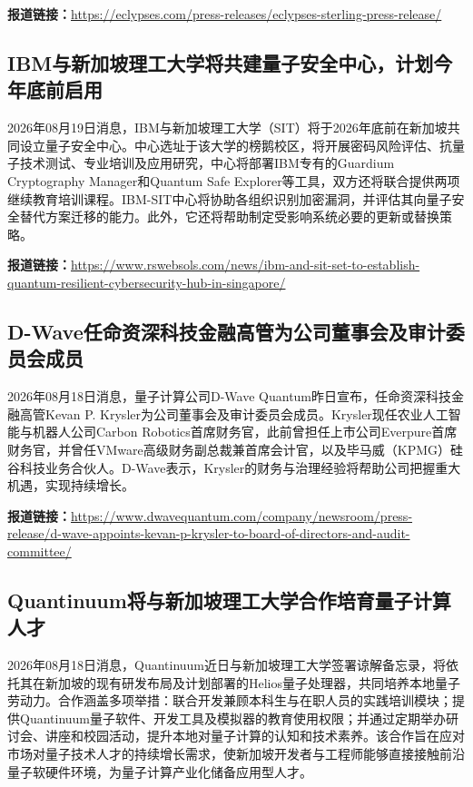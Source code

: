 \documentclass[12pt,a4paper]{ctexart}
\begin{document}
\noindent\textbf{报道链接：}\url{https://eclypses.com/press-releases/eclypses-sterling-press-release/}

\subsection{ IBM与新加坡理工大学将共建量子安全中心，计划今年底前启用 }

2026年08月19日消息，IBM与新加坡理工大学（SIT）将于2026年底前在新加坡共同设立量子安全中心。中心选址于该大学的榜鹅校区，将开展密码风险评估、抗量子技术测试、专业培训及应用研究，中心将部署IBM专有的Guardium Cryptography Manager和Quantum Safe Explorer等工具，双方还将联合提供两项继续教育培训课程。IBM-SIT中心将协助各组织识别加密漏洞，并评估其向量子安全替代方案迁移的能力。此外，它还将帮助制定受影响系统必要的更新或替换策略。

\noindent\textbf{报道链接：}\url{https://www.rswebsols.com/news/ibm-and-sit-set-to-establish-quantum-resilient-cybersecurity-hub-in-singapore/}

\subsection{ D-Wave任命资深科技金融高管为公司董事会及审计委员会成员 }

2026年08月18日消息，量子计算公司D-Wave Quantum昨日宣布，任命资深科技金融高管Kevan P. Krysler为公司董事会及审计委员会成员。Krysler现任农业人工智能与机器人公司Carbon Robotics首席财务官，此前曾担任上市公司Everpure首席财务官，并曾任VMware高级财务副总裁兼首席会计官，以及毕马威（KPMG）硅谷科技业务合伙人。D-Wave表示，Krysler的财务与治理经验将帮助公司把握重大机遇，实现持续增长。

\noindent\textbf{报道链接：}\url{https://www.dwavequantum.com/company/newsroom/press-release/d-wave-appoints-kevan-p-krysler-to-board-of-directors-and-audit-committee/}

\subsection{ Quantinuum将与新加坡理工大学合作培育量子计算人才 }

2026年08月18日消息，Quantinuum近日与新加坡理工大学签署谅解备忘录，将依托其在新加坡的现有研发布局及计划部署的Helios量子处理器，共同培养本地量子劳动力。合作涵盖多项举措：联合开发兼顾本科生与在职人员的实践培训模块；提供Quantinuum量子软件、开发工具及模拟器的教育使用权限；并通过定期举办研讨会、讲座和校园活动，提升本地对量子计算的认知和技术素养。该合作旨在应对市场对量子技术人才的持续增长需求，使新加坡开发者与工程师能够直接接触前沿量子软硬件环境，为量子计算产业化储备应用型人才。
\end{document}
